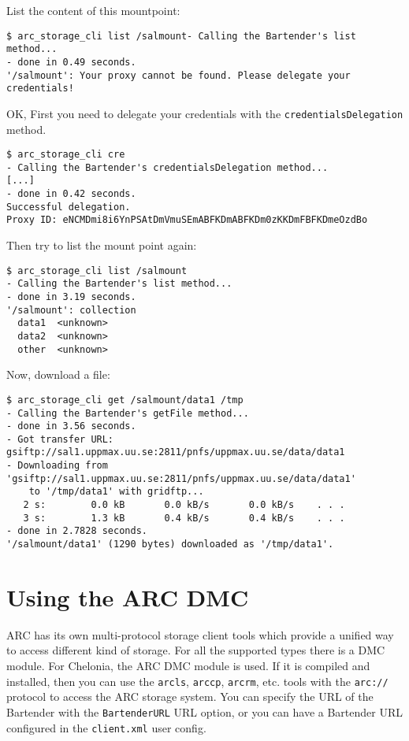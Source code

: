 \documentclass{article}
\begin{document}
List the content of this mountpoint:

\begin{verbatim}
$ arc_storage_cli list /salmount- Calling the Bartender's list method...
- done in 0.49 seconds.
'/salmount': Your proxy cannot be found. Please delegate your credentials!
\end{verbatim}

OK, First you need to delegate your credentials with the \verb!credentialsDelegation! method.

\begin{verbatim}
$ arc_storage_cli cre
- Calling the Bartender's credentialsDelegation method...
[...]
- done in 0.42 seconds.
Successful delegation.
Proxy ID: eNCMDmi8i6YnPSAtDmVmuSEmABFKDmABFKDm0zKKDmFBFKDmeOzdBo
\end{verbatim}

Then try to list the mount point again:

\begin{verbatim}
$ arc_storage_cli list /salmount
- Calling the Bartender's list method...
- done in 3.19 seconds.
'/salmount': collection
  data1  <unknown>
  data2  <unknown>
  other  <unknown>
\end{verbatim}

Now, download a file:

\begin{verbatim}
$ arc_storage_cli get /salmount/data1 /tmp
- Calling the Bartender's getFile method...
- done in 3.56 seconds.
- Got transfer URL: gsiftp://sal1.uppmax.uu.se:2811/pnfs/uppmax.uu.se/data/data1
- Downloading from 'gsiftp://sal1.uppmax.uu.se:2811/pnfs/uppmax.uu.se/data/data1'
    to '/tmp/data1' with gridftp...
   2 s:        0.0 kB       0.0 kB/s       0.0 kB/s    . . .       
   3 s:        1.3 kB       0.4 kB/s       0.4 kB/s    . . .       
- done in 2.7828 seconds.
'/salmount/data1' (1290 bytes) downloaded as '/tmp/data1'.
\end{verbatim}

\section{Using the ARC DMC} %
\label{sec:using_the_arc_dmc}

ARC has its own multi-protocol storage client tools which provide a unified way to access different kind of storage. For all the supported types there is a DMC module. For Chelonia, the ARC DMC module is used. If it is compiled and installed, then you can use the \verb!arcls!, \verb!arccp!, \verb!arcrm!, etc. tools with the \verb!arc://! protocol to access the ARC storage system. You can specify the URL of the Bartender with the \verb!BartenderURL! URL option, or you can have a Bartender URL configured in the \verb!client.xml! user config.
\end{document}
